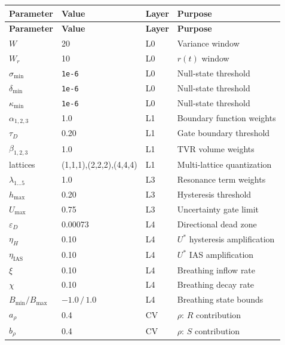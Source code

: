 \documentclass[11pt,a4paper]{article}
\begin{document}
\begin{center}
\small
\begin{longtable}{L{3.0cm}R{2.8cm}C{1.2cm}L{5.5cm}}
\toprule
\textbf{Parameter} & \textbf{Value} & \textbf{Layer} & \textbf{Purpose}\\
\midrule
\endfirsthead
\toprule
\textbf{Parameter} & \textbf{Value} & \textbf{Layer} & \textbf{Purpose}\\
\midrule
\endhead
\bottomrule
\endfoot
\endlastfoot
$W$                & 20            & L0 & Variance window\\
$W_r$              & 10            & L0 & $r(t)$ window\\
$\sigma_{\min}$    & \texttt{1e-6} & L0 & Null-state threshold\\
$\delta_{\min}$    & \texttt{1e-6} & L0 & Null-state threshold\\
$\kappa_{\min}$    & \texttt{1e-6} & L0 & Null-state threshold\\
$\alpha_{1,2,3}$   & 1.0           & L1 & Boundary function weights\\
$\tau_D$           & 0.20          & L1 & Gate boundary threshold\\
$\beta_{1,2,3}$    & 1.0           & L1 & TVR volume weights\\
lattices           & (1,1,1),(2,2,2),(4,4,4) & L1 & Multi-lattice quantization\\
$\lambda_{1\ldots5}$ & 1.0         & L3 & Resonance term weights\\
$h_{\max}$         & 0.20          & L3 & Hysteresis threshold\\
$U_{\max}$         & 0.75          & L3 & Uncertainty gate limit\\
$\varepsilon_D$    & 0.00073       & L4 & Directional dead zone\\
$\eta_H$           & 0.10          & L4 & $U^*$ hysteresis amplification\\
$\eta_{\text{IAS}}$& 0.10          & L4 & $U^*$ IAS amplification\\
$\xi$              & 0.10          & L4 & Breathing inflow rate\\
$\chi$             & 0.10          & L4 & Breathing decay rate\\
$B_{\min}/B_{\max}$& $-1.0\,/\,1.0$& L4 & Breathing state bounds\\
$a_\rho$           & 0.4           & CV & $\rho$: $R$ contribution\\
$b_\rho$           & 0.4           & CV & $\rho$: $S$ contribution\\

\end{longtable}
\end{center}
\end{document}
